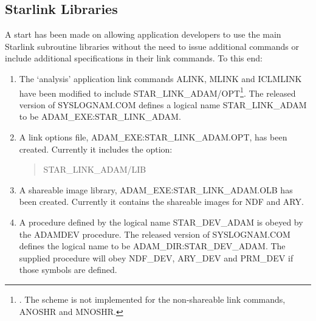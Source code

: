 \subsection{Starlink Libraries}
\label{starshrlib}
A start has been made on allowing application developers to use the main
Starlink subroutine libraries without the need to issue additional commands
or include additional specifications in their link commands.
To this end:
\begin{enumerate}
\item The `analysis' application link commands ALINK, MLINK and ICLMLINK have 
been modified to include STAR\_LINK\_ADAM/OPT\footnote{.
The scheme is not implemented for the non-shareable link commands, 
ANOSHR and MNOSHR.}.
The released version of SYSLOGNAM.COM defines a logical name STAR\_LINK\_ADAM
to be ADAM\-\_EXE:\-STAR\-\_LINK\-\_ADAM.

\item A link options file, ADAM\_EXE:STAR\_LINK\_ADAM.OPT, has been created.
Currently it includes the option:
\begin{quote}
STAR\_LINK\_ADAM/LIB
\end{quote}

\item A shareable image library, ADAM\_EXE:STAR\_LINK\_ADAM.OLB has been 
created.
Currently it contains the shareable images for NDF and ARY.

\item A procedure defined by the logical name STAR\_DEV\_ADAM is obeyed by 
the ADAMDEV procedure.
The released version of SYSLOGNAM.COM defines the logical name to be
ADAM\_DIR:\-STAR\_DEV\_ADAM.
The supplied procedure will obey NDF\_DEV, ARY\_DEV and PRM\_DEV if those 
symbols are defined.
\end{enumerate}


